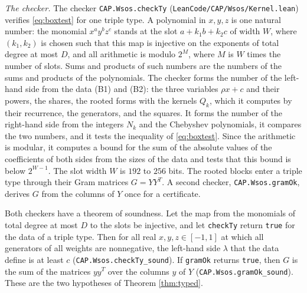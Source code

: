 \documentclass[reqno,a4paper,11pt]{amsart}
\numberwithin{equation}{section}
\newcommand{\lean}[1]{\texttt{#1}}
\newcommand{\file}[1]{\nolinkurl{#1}}
\begin{document}
\emph{The checker.} The checker \lean{CAP.Wsos.checkTy} (\file{LeanCode/CAP/Wsos/Kernel.lean}) verifies \eqref{eq:boxtest} for one triple type. A polynomial in $x, y, z$ is one natural number: the monomial $x^a y^b z^c$ stands at the slot $a + k_1 b + k_2 c$ of width $W$, where $(k_1, k_2)$ is chosen such that this map is injective on the exponents of total degree at most $D$, and all arithmetic is modulo $2^M$, where $M$ is $W$ times the number of slots. Sums and products of such numbers are the numbers of the sums and products of the polynomials. The checker forms the number of the left-hand side from the data (B1) and (B2): the three variables $\rho x + c$ and their powers, the shares, the rooted forms with the kernels $Q_k$, which it computes by their recurrence, the generators, and the squares. It forms the number of the right-hand side from the integers $N_k$ and the Chebyshev polynomials, it compares the two numbers, and it tests the inequality of \eqref{eq:boxtest}. Since the arithmetic is modular, it computes a bound for the sum of the absolute values of the coefficients of both sides from the sizes of the data and tests that this bound is below $2^{W-1}$. The slot width $W$ is $192$ to $256$ bits. The rooted blocks enter a triple type through their Gram matrices $G = Y Y^T$. A second checker, \lean{CAP.Wsos.gramOk}, derives $G$ from the columns of $Y$ once for a certificate.

Both checkers have a theorem of soundness. Let the map from the monomials of total degree at most $D$ to the slots be injective, and let \lean{checkTy} return \lean{true} for the data of a triple type. Then for all real $x, y, z \in [-1,1]$ at which all generators of all weights are nonnegative, the left-hand side $\lambda$ that the data define is at least $c$ (\lean{CAP.Wsos.checkTy\_sound}). If \lean{gramOk} returns \lean{true}, then $G$ is the sum of the matrices $y y^T$ over the columns $y$ of $Y$ (\lean{CAP.Wsos.gramOk\_sound}). These are the two hypotheses of Theorem \ref{thm:typed}.
\end{document}

